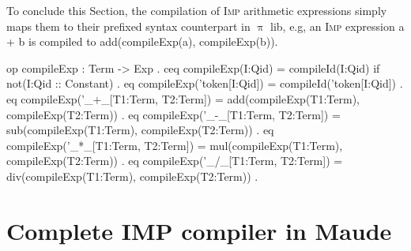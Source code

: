 \documentclass[a4paper,openany]{book}
\begin{document}
To conclude this Section, the compilation of \textsc{Imp} arithmetic expressions simply maps them to their prefixed syntax counterpart in $\uppi$ lib, e.g, an \textsc{Imp} expression a + b is compiled to add(compileExp(a), compileExp(b)).
\begin{maude}
 op compileExp : Term -> Exp .
 ceq compileExp(I:Qid) = compileId(I:Qid) if not(I:Qid :: Constant) .
 eq compileExp('token[I:Qid]) = compileId('token[I:Qid]) .
 eq compileExp('_+_[T1:Term, T2:Term]) = add(compileExp(T1:Term), compileExp(T2:Term)) .
 eq compileExp('_-_[T1:Term, T2:Term]) = sub(compileExp(T1:Term), compileExp(T2:Term)) .
 eq compileExp('_*_[T1:Term, T2:Term]) = mul(compileExp(T1:Term), compileExp(T2:Term)) .
 eq compileExp('_/_[T1:Term, T2:Term]) = div(compileExp(T1:Term), compileExp(T2:Term)) .
\end{maude}
%
% 
%



\section{Complete IMP compiler in Maude}
\end{document}
